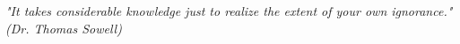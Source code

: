 \begin{epigrafe}
    \vspace*{\fill}
	\begin{flushright}
	\textit{"It takes considerable knowledge just to realize the extent of your own ignorance."\\
		(Dr. Thomas Sowell)}
	\end{flushright}
\end{epigrafe}
\newpage